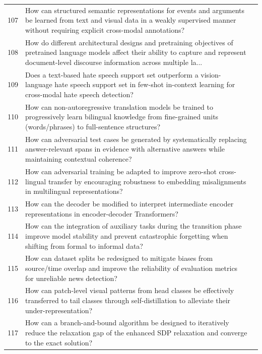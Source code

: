 \begin{longtable}{@{}p{0.5cm}p{7.2cm}p{2.5cm}@{}}
107 & How can structured semantic representations for events and arguments be learned from text and visual data in a weakly supervised manner without requiring explicit cross-modal annotations? & \cite{10.18653/v1/2020.acl-main.230} \\
108 & How do different architectural designs and pretraining objectives of pretrained language models affect their ability to capture and represent document-level discourse information across multiple la... & \cite{10.18653/v1/2021.naacl-main.301} \\
109 & Does a text-based hate speech support set outperform a vision-language hate speech support set in few-shot in-context learning for cross-modal hate speech detection? & \cite{10.18653/v1/2024.emnlp-main.445} \\
110 & How can non-autoregressive translation models be trained to progressively learn bilingual knowledge from fine-grained units (words/phrases) to full-sentence structures? & \cite{10.18653/v1/2021.findings-acl.247} \\
111 & How can adversarial test cases be generated by systematically replacing answer-relevant spans in evidence with alternative answers while maintaining contextual coherence? & \cite{10.18653/v1/2024.findings-naacl.85} \\
112 & How can adversarial training be adapted to improve zero-shot cross-lingual transfer by encouraging robustness to embedding misalignments in multilingual representations? & \cite{10.18653/v1/2021.emnlp-main.126} \\
113 & How can the decoder be modified to interpret intermediate encoder representations in encoder-decoder Transformers? & \cite{10.18653/v1/2024.findings-naacl.296} \\
114 & How can the integration of auxiliary tasks during the transition phase improve model stability and prevent catastrophic forgetting when shifting from formal to informal data? & \cite{10.18653/v1/2020.findings-emnlp.282} \\
115 & How can dataset splits be redesigned to mitigate biases from source/time overlap and improve the reliability of evaluation metrics for unreliable news detection? & \cite{10.18653/v1/2021.eacl-main.211} \\
116 & How can patch-level visual patterns from head classes be effectively transferred to tail classes through self-distillation to alleviate their under-representation? & \cite{10.1609/aaai.v38i6.28459} \\
117 & How can a branch-and-bound algorithm be designed to iteratively reduce the relaxation gap of the enhanced SDP relaxation and converge to the exact solution? & \cite{10.1609/aaai.v37i12.26745} \\

\end{longtable}
